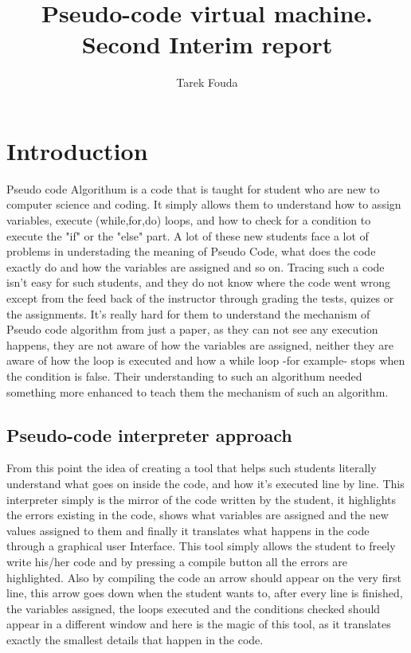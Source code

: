 \documentclass[a4paper]{article}
\author{Tarek Fouda}
\title{Pseudo-code virtual machine. Second Interim report}
\begin{document}
\maketitle
\section{Introduction}
Pseudo code Algorithum is a code that is taught for student who are new to computer science and coding.
It simply allows them to understand how to assign variables, execute (while,for,do) loops, and how to check for a condition to execute the "if" or the "else" part.
A lot of these new students face a lot of problems in understading the meaning of Pseudo Code, what does the code exactly do and how the variables are assigned and so on. Tracing such a code isn't easy for such students, and they do not know where the code went wrong except from the feed back of the instructor through grading the tests, quizes or the assignments. It's really hard for them to understand the mechanism of Pseudo code algorithm from just a paper, as they can not see any execution happens, they are not aware of how the variables are assigned, neither they are aware of how the loop is executed and how a while loop -for example- stops when the condition is false. Their understanding to such an algorithum needed something more enhanced to teach them the mechanism of such an algorithm.

\subsection{Pseudo-code interpreter approach}
From this point the idea of creating a tool that helps such students literally understand what goes on inside the code, and how it's executed line by line. This interpreter simply is the mirror of the code written by the student, it highlights the errors existing in the code, shows what variables are assigned and the new values assigned to them and finally it translates what happens in the code through a graphical user Interface.
This tool simply allows the student to freely write his/her code and by pressing a compile button all the errors are highlighted. Also by compiling the code an arrow should appear on the very first line, this arrow goes down when the student wants to, after every line is finished, the variables assigned, the loops executed and the conditions checked should appear in a different window and here is the magic of this tool, as it translates exactly the smallest details that happen in the code.
\end{document}
